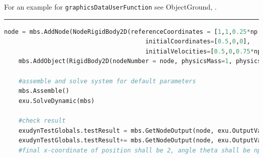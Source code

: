     For an example for \texttt{graphicsDataUserFunction} see ObjectGround, .
    \finishTable
\vspace{6pt}\par\noindent\rule{\textwidth}{0.4pt}
\label{miniExample_ObjectRigidBody2D}
\pythonstyle
\begin{lstlisting}[language=Python, firstnumber=1]
    node = mbs.AddNode(NodeRigidBody2D(referenceCoordinates = [1,1,0.25*np.pi], 
                                       initialCoordinates=[0.5,0,0],
                                       initialVelocities=[0.5,0,0.75*np.pi]))
    mbs.AddObject(RigidBody2D(nodeNumber = node, physicsMass=1, physicsInertia=2))

    #assemble and solve system for default parameters
    mbs.Assemble()
    exu.SolveDynamic(mbs)

    #check result
    exudynTestGlobals.testResult = mbs.GetNodeOutput(node, exu.OutputVariableType.Position)[0]
    exudynTestGlobals.testResult+= mbs.GetNodeOutput(node, exu.OutputVariableType.Coordinates)[2]
    #final x-coordinate of position shall be 2, angle theta shall be np.pi
\end{lstlisting}


